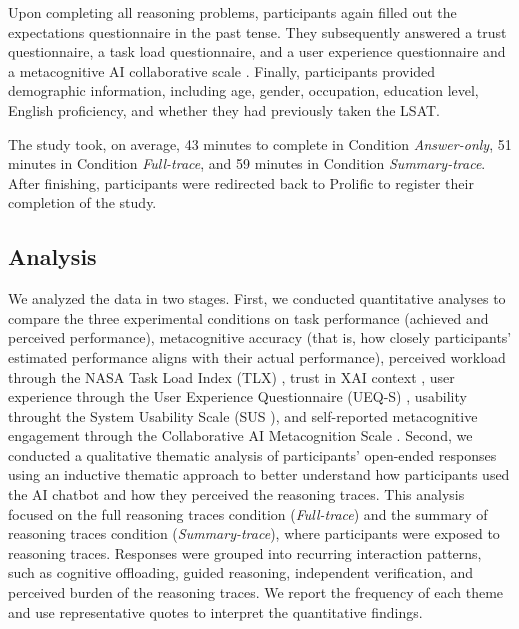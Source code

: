 \documentclass[acmlarge,review=true, anonymous=true]{acmart}
\begin{document}
Upon completing all reasoning problems, participants again filled out the expectations questionnaire in the past tense. They subsequently answered a trust questionnaire, a task load questionnaire, and a user experience questionnaire and a metacognitive AI collaborative scale \cite{Sidra03042026}. Finally, participants provided demographic information, including age, gender, occupation, education level, English proficiency, and whether they had previously taken the LSAT.

The study took, on average, 43 minutes to complete in Condition \textit{Answer-only}, 51 minutes in Condition \textit{Full-trace}, and 59 minutes in Condition \textit{Summary-trace}. After finishing, participants were redirected back to Prolific to register their completion of the study.

\subsection{Analysis}
We analyzed the data in two stages. First, we conducted quantitative analyses to compare the three experimental conditions on task performance (achieved and perceived performance), metacognitive accuracy (that is, how closely participants' estimated performance aligns with their actual performance), perceived workload through the NASA Task Load Index (TLX) \cite{HART1988139}, trust in XAI context \cite{measures_XAI}, user experience through the User Experience Questionnaire (UEQ-S) \cite{articleUEQS}, usability throught the System Usability Scale (SUS \cite{}), and self-reported metacognitive engagement through the Collaborative AI Metacognition Scale \cite{Sidra03042026}. Second, we conducted a qualitative thematic analysis of participants’ open-ended responses using an inductive thematic approach \cite{clarke2017thematic} to better understand how participants used the AI chatbot and how they perceived the reasoning traces. This analysis focused on the full reasoning traces condition (\textit{Full-trace}) and the summary of reasoning traces condition (\textit{Summary-trace}), where participants were exposed to reasoning traces. Responses were grouped into recurring interaction patterns, such as cognitive offloading, guided reasoning, independent verification, and perceived burden of the reasoning traces. We report the frequency of each theme and use representative quotes to interpret the quantitative findings.
\end{document}
